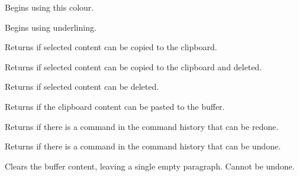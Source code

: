 \label{wxrichtextctrlbegintextcolour}


Begins using this colour.

\label{wxrichtextctrlbeginunderline}


Begins using underlining.

\label{wxrichtextctrlcancopy}


Returns \true if selected content can be copied to the clipboard.

\label{wxrichtextctrlcancut}


Returns \true if selected content can be copied to the clipboard and deleted.

\label{wxrichtextctrlcandeleteselection}


Returns \true if selected content can be deleted.

\label{wxrichtextctrlcanpaste}


Returns \true if the clipboard content can be pasted to the buffer.

\label{wxrichtextctrlcanredo}


Returns \true if there is a command in the command history that can be redone.

\label{wxrichtextctrlcanundo}


Returns \true if there is a command in the command history that can be undone.

\label{wxrichtextctrlclear}


Clears the buffer content, leaving a single empty paragraph. Cannot be undone.


